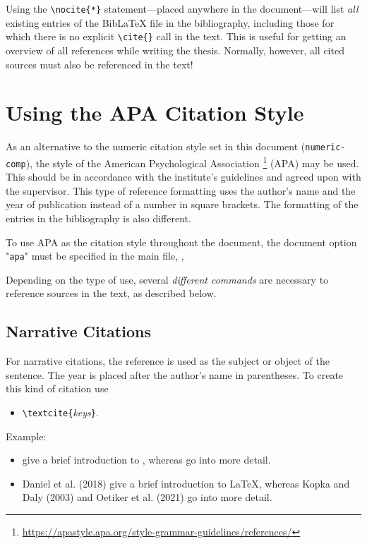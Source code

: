 Using the \verb!\nocite{*}! statement---placed anywhere in the document---will
list \emph{all} existing entries of the BibLaTeX file in the bibliography,
including those for which there is no explicit \verb!\cite{}! call in the text.
This is useful for getting an overview of all references while writing the thesis.
Normally, however, all cited sources must also be referenced in the text!


\section{Using the APA Citation Style}

As an alternative to the numeric citation style set in this document
(\texttt{numeric-comp}), the style of the American Psychological Association%
\footnote{\url{https://apastyle.apa.org/style-grammar-guidelines/references/}}
(APA) may be used. This should be in accordance with the institute's guidelines
and agreed upon with the supervisor. This type of reference formatting uses the
author's name and the year of publication instead of a number in square
brackets. The formatting of the entries in the bibliography is also different.

To use APA as the citation style throughout the document, the document option
"\texttt{apa}" must be specified in the main file, \eg,
%
%
Depending on the type of use, several \emph{different commands} are necessary
to reference sources in the text, as described below.

\subsection{Narrative Citations}

For narrative citations, the reference is used as the subject or object of the
sentence. The year is placed after the author's name in parentheses. To create
this kind of citation use 
%
\begin{itemize}
    \item[] \verb!\textcite{!\textit{keys}\verb!}!.
\end{itemize}
%
Example:
%
\begin{itemize}
\item[]
\begin{LaTeXCode}[numbers=none,breakindent=0pt]
\textcite{Daniel2018} give a brief introduction to \latex, whereas
\textcite{Oetiker2021, Kopka2003} go into more detail.
\end{LaTeXCode}
\item[]
    Daniel et al. (2018) give a brief introduction to LaTeX, whereas Kopka and
    Daly (2003) and Oetiker et al. (2021) go into more detail.
\end{itemize}


